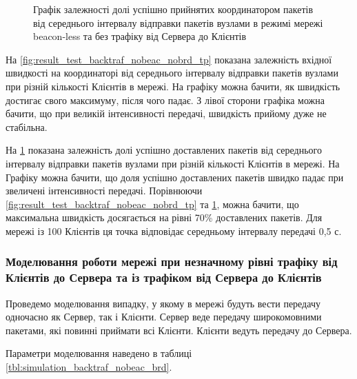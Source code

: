 \documentclass[a4paper,ukrainian,utf8,nocolumnsxix,floatsection,equationsection]{eskdtext}
\newcommand{\longcaption}[1]{\captionsetup{style=figureLongCaption}\caption{#1}}
\renewcommand\paragraph{\subsubsection}
\newcommand{\blm}[0]{beacon-less\xspace}
\begin{document}
\begin{figure}[htbp]
	\centering
	\longcaption{\label{fig:result_test_backtraf_nobeac_nobrd_succ_rate}Графік залежності долі успішно прийнятих координатором пакетів від середнього інтервалу відправки пакетів вузлами в режимі мережі \blm та без трафіку від Сервера до Клієнтів}
\end{figure}

На \cref{fig:result_test_backtraf_nobeac_nobrd_tp} показана залежність вхідної швидкості на координаторі від середнього інтервалу відправки пакетів вузлами при різній кількості Клієнтів в мережі. На графіку можна бачити, як швидкість достигає свого максимуму, після чого падає. З лівої сторони графіка можна бачити, що при великій інтенсивності передачі, швидкість прийому дуже не стабільна.

На \cref{fig:result_test_backtraf_nobeac_nobrd_succ_rate} показана залежність долі успішно доставлених пакетів від середнього інтервалу відправки пакетів вузлами при різній кількості Клієнтів в мережі. На Графіку можна бачити, що доля успішно доставлених пакетів швидко падає при звеличені інтенсивності передачі. Порівнюючи \cref{fig:result_test_backtraf_nobeac_nobrd_tp} та \cref{fig:result_test_backtraf_nobeac_nobrd_succ_rate}, можна бачити, що максимальна швидкість досягається на рівні 70\% доставлених пакетів. Для мережі із 100 Клієнтів ця точка відповідає середньому інтервалу передачі 0,5 с.

\paragraph{Моделювання роботи мережі при незначному рівні трафіку від Клієнтів до Сервера та із трафіком від Сервера до Клієнтів}

Проведемо моделювання випадку, у якому в мережі будуть вести передачу одночасно як Сервер, так і Клієнти. Сервер веде передачу широкомовними пакетами, які повинні приймати всі Клієнти. Клієнти ведуть передачу до Сервера.

Параметри моделювання наведено в таблиці \ref{tbl:simulation_backtraf_nobeac_brd}.
\end{document}
